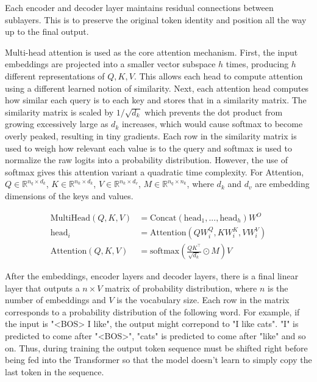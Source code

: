 \documentclass{article}
\begin{document}
Each encoder and decoder layer maintains residual connections between sublayers. This is to preserve the original token identity and position all the way up to the final output.

Multi-head attention is used as the core attention mechanism. First, the input embeddings are projected into a smaller vector subspace $h$ times, producing $h$ different representations of $Q, K, V$. This allows each head to compute attention using a different learned notion of similarity. Next, each attention head computes how similar each query is to each key and stores that in a similarity matrix. The similarity matrix is scaled by $1 / \sqrt{d_k}$ which prevents the dot product from growing excessively large as $d_k$ increases, which would cause softmax to become overly peaked, resulting in tiny gradients. Each row in the similarity matrix is used to weigh how relevant each value is to the query and softmax is used to normalize the raw logits into a probability distribution. However, the use of softmax gives this attention variant a quadratic time complexity. For Attention, $Q \in \mathbb{R}^{n_q \times d_k}$, $K \in \mathbb{R}^{n_k \times d_k}$, $V \in \mathbb{R}^{n_k \times d_v}$, $M \in \mathbb{R}^{n_q \times n_k}$, where $d_k$ and $d_v$ are embedding dimensions of the keys and values.

\begin{align*}
\text{MultiHead}(Q, K, V) &= \text{Concat} \left( \text{head}_1, ..., \text{head}_h \right) W^O \\
\text{head}_i &= \text{Attention}(Q W_i^Q, K W_i^K, V W_{i}^V) \\
\text{Attention}(Q, K, V) &= \text{softmax} \left( \frac{Q K^{\top}}{\sqrt{d_k}} \odot M \right) V
\end{align*}

After the embeddings, encoder layers and decoder layers, there is a final linear layer that outputs a $n \times V$ matrix of probability distribution, where $n$ is the number of embeddings and $V$ is the vocabulary size. Each row in the matrix corresponds to a probability distribution of the following word. For example, if the input is "<BOS> I like", the output might correpond to "I like cats". "I" is predicted to come after "<BOS>", "cats" is predicted to come after "like" and so on. Thus, during training the output token sequence must be shifted right before being fed into the Transformer so that the model doesn't learn to simply copy the last token in the sequence.
\end{document}
